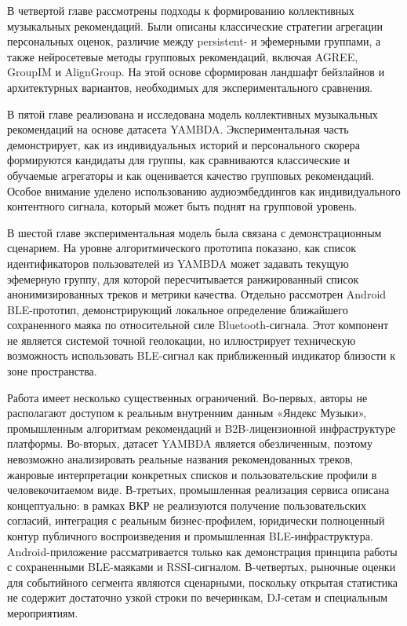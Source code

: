 В четвертой главе рассмотрены подходы к формированию коллективных музыкальных рекомендаций. Были описаны классические стратегии агрегации персональных оценок, различие между persistent- и эфемерными группами, а также нейросетевые методы групповых рекомендаций, включая AGREE, GroupIM и AlignGroup. На этой основе сформирован ландшафт бейзлайнов и архитектурных вариантов, необходимых для экспериментального сравнения.

В пятой главе реализована и исследована модель коллективных музыкальных рекомендаций на основе датасета YAMBDA. Экспериментальная часть демонстрирует, как из индивидуальных историй и персонального скорера формируются кандидаты для группы, как сравниваются классические и обучаемые агрегаторы и как оценивается качество групповых рекомендаций. Особое внимание уделено использованию аудиоэмбеддингов как индивидуального контентного сигнала, который может быть поднят на групповой уровень.

В шестой главе экспериментальная модель была связана с демонстрационным сценарием. На уровне алгоритмического прототипа показано, как список идентификаторов пользователей из YAMBDA может задавать текущую эфемерную группу, для которой пересчитывается ранжированный список анонимизированных треков и метрики качества. Отдельно рассмотрен Android BLE-прототип, демонстрирующий локальное определение ближайшего сохраненного маяка по относительной силе Bluetooth-сигнала. Этот компонент не является системой точной геолокации, но иллюстрирует техническую возможность использовать BLE-сигнал как приближенный индикатор близости к зоне пространства.

Работа имеет несколько существенных ограничений. Во-первых, авторы не располагают доступом к реальным внутренним данным «Яндекс Музыки», промышленным алгоритмам рекомендаций и B2B-лицензионной инфраструктуре платформы. Во-вторых, датасет YAMBDA является обезличенным, поэтому невозможно анализировать реальные названия рекомендованных треков, жанровые интерпретации конкретных списков и пользовательские профили в человекочитаемом виде. В-третьих, промышленная реализация сервиса описана концептуально: в рамках ВКР не реализуются получение пользовательских согласий, интеграция с реальным бизнес-профилем, юридически полноценный контур публичного воспроизведения и промышленная BLE-инфраструктура. Android-приложение рассматривается только как демонстрация принципа работы с сохраненными BLE-маяками и RSSI-сигналом. В-четвертых, рыночные оценки для событийного сегмента являются сценарными, поскольку открытая статистика не содержит достаточно узкой строки по вечеринкам, DJ-сетам и специальным мероприятиям.

